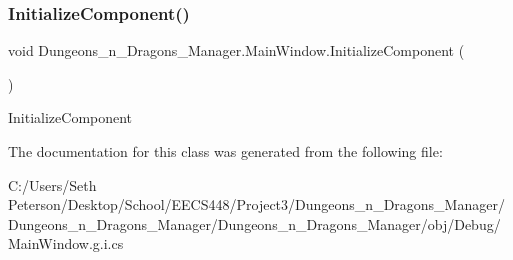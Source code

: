 \subsubsection{\texorpdfstring{Initialize\+Component()}{InitializeComponent()}}
{\footnotesize\ttfamily void Dungeons\+\_\+n\+\_\+\+Dragons\+\_\+\+Manager.\+Main\+Window.\+Initialize\+Component (\begin{DoxyParamCaption}{ }\end{DoxyParamCaption})\hspace{0.3cm}{\ttfamily [inline]}}



Initialize\+Component 



The documentation for this class was generated from the following file\+:\begin{DoxyCompactItemize}
\item 
C\+:/\+Users/\+Seth Peterson/\+Desktop/\+School/\+E\+E\+C\+S448/\+Project3/\+Dungeons\+\_\+n\+\_\+\+Dragons\+\_\+\+Manager/\+Dungeons\+\_\+n\+\_\+\+Dragons\+\_\+\+Manager/\+Dungeons\+\_\+n\+\_\+\+Dragons\+\_\+\+Manager/obj/\+Debug/Main\+Window.\+g.\+i.\+cs\end{DoxyCompactItemize}
